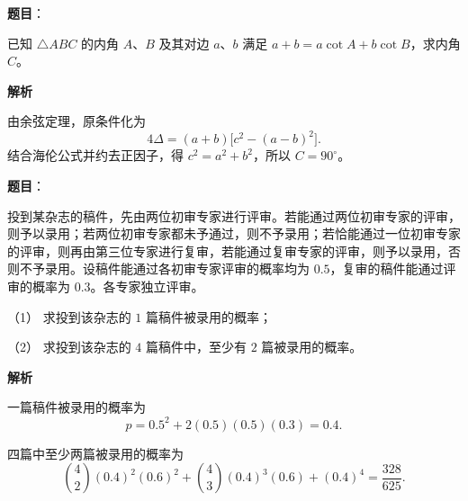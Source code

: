 \begin{answer}

\textbf{题目}：

已知 $\triangle ABC$ 的内角 $A\text{、}B$ 及其对边 $a\text{、}b$ 满足 $a+b=a\cot A+b\cot B$，求内角 $C$。

\textbf{解析}

由余弦定理，原条件化为
\nopagebreak[4]
\[
4\Delta=(a+b)\bigl[c^2-(a-b)^2\bigr].
\]
结合海伦公式并约去正因子，得
$c^2=a^2+b^2$，所以 $C=90^\circ$。


\end{answer}
\begin{answer}

\textbf{题目}：

投到某杂志的稿件，先由两位初审专家进行评审。若能通过两位初审专家的评审，则予以录用；若两位初审专家都未予通过，则不予录用；若恰能通过一位初审专家的评审，则再由第三位专家进行复审，若能通过复审专家的评审，则予以录用，否则不予录用。设稿件能通过各初审专家评审的概率均为 $0.5$，复审的稿件能通过评审的概率为 $0.3$。各专家独立评审。

（1） 求投到该杂志的 $1$ 篇稿件被录用的概率；

（2） 求投到该杂志的 $4$ 篇稿件中，至少有 $2$ 篇被录用的概率。

\textbf{解析}


一篇稿件被录用的概率为
\nopagebreak[4]
\[
p=0.5^2+2(0.5)(0.5)(0.3)=0.4.
\]


四篇中至少两篇被录用的概率为
\nopagebreak[4]
\[
\binom42(0.4)^2(0.6)^2+\binom43(0.4)^3(0.6)+(0.4)^4
=\frac{328}{625}.
\]



\end{answer}
